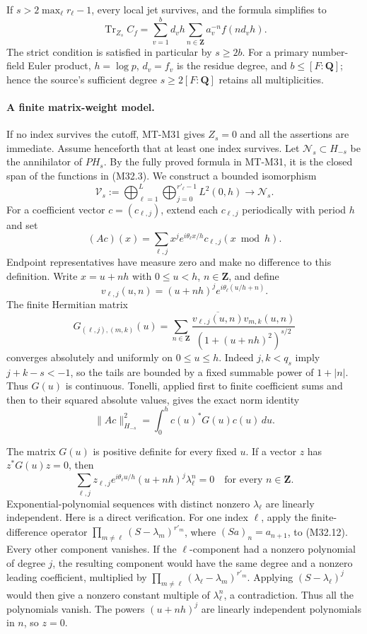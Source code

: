 If $s>2\max_\ell r_\ell-1$, every local jet survives,
and the formula simplifies to
\[
 \operatorname{Tr}_{Z_s}C_f
       =\sum_{v=1}^{b}d_vh
                     \sum_{n\in\mathbf Z}a_v^{-n}f(nd_vh).
 \tag{M32.6}
\]
The strict condition is satisfied in particular by
$s\geq2b$.  For a primary number-field Euler product,
$h=\log p$, $d_v=f_v$ is the residue degree, and
$b\leq[F:\mathbf Q]$; hence the source's sufficient
degree $s\geq2[F:\mathbf Q]$ retains all multiplicities.

\paragraph{A finite matrix-weight model.}
If no index survives the cutoff, MT-M31 gives $Z_s=0$
and all the assertions are immediate.  Assume henceforth
that at least one index survives.
Let $\mathcal N_s\subset H_{-s}$ be the annihilator of
$PH_s$.  By the fully proved formula in MT-M31,
it is the closed span of the functions in (M32.3).
We construct a bounded isomorphism
\[
 \mathcal V_s:=\bigoplus_{\ell=1}^{L}
                     \bigoplus_{j=0}^{r'_\ell-1}L^2(0,h)
                  \longrightarrow\mathcal N_s.
 \tag{M32.7}
\]
For a coefficient vector $c=(c_{\ell,j})$, extend each
$c_{\ell,j}$ periodically with period $h$ and set
\[
 (Ac)(x)=\sum_{\ell,j}
       x^j e^{i\theta_\ell x/h}c_{\ell,j}(x\bmod h).
 \tag{M32.8}
\]
Endpoint representatives have measure zero and make no
difference to this definition.  Write $x=u+nh$ with
$0\leq u<h$, $n\in\mathbf Z$, and define
\[
 v_{\ell,j}(u,n)=(u+nh)^j
                         e^{i\theta_\ell(u/h+n)}.
 \tag{M32.9}
\]
The finite Hermitian matrix
\[
 G_{(\ell,j),(m,k)}(u)
   =\sum_{n\in\mathbf Z}
       \frac{\overline{v_{\ell,j}(u,n)}v_{m,k}(u,n)}
                  {(1+(u+nh)^2)^{s/2}}
 \tag{M32.10}
\]
converges absolutely and uniformly on $0\leq u\leq h$.
Indeed $j,k<q_s$ imply $j+k-s<-1$, so the tails
are bounded by a fixed summable power of $1+|n|$.
Thus $G(u)$ is continuous.  Tonelli, applied first to
finite coefficient sums and then to their squared absolute
values, gives the exact norm identity
\[
           \|Ac\|_{H_{-s}}^2
                =\int_0^h c(u)^*G(u)c(u)\,du.
 \tag{M32.11}
\]

The matrix $G(u)$ is positive definite for every fixed $u$.
If a vector $z$ has $z^*G(u)z=0$, then
\[
       \sum_{\ell,j}z_{\ell,j}
          e^{i\theta_\ell u/h}(u+nh)^j\lambda_\ell^n=0
                       \quad\text{for every }n\in\mathbf Z.
 \tag{M32.12}
\]
Exponential-polynomial sequences with distinct nonzero
$\lambda_\ell$ are linearly independent.
Here is a direct verification.  For one index $\ell$, apply
the finite-difference operator
$\prod_{m\ne\ell}(S-\lambda_m)^{r'_m}$, where
$(Sa)_n=a_{n+1}$, to (M32.12).  Every other component
vanishes.  If the $\ell$-component had a nonzero polynomial
of degree $j$, the resulting component would have the
same degree and a nonzero leading coefficient, multiplied
by $\prod_{m\ne\ell}(\lambda_\ell-\lambda_m)^{r'_m}$.
Applying $(S-\lambda_\ell)^j$ would then give a nonzero
constant multiple of $\lambda_\ell^n$, a contradiction.
Thus all the polynomials vanish.  The powers $(u+nh)^j$
are linearly independent polynomials in $n$, so $z=0$.

